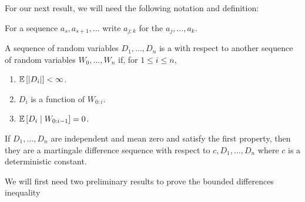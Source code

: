 \documentclass[11pt]{scrartcl}
\begin{document}
For our next result, we will need the following notation and definition:

For a sequence $a_s, a_{s+1}, ... $ write $a_{j:k}$ for the  $a_j, ... , a_k$.

\begin{definition}
A sequence of random variables $D_1, ... , D_n$ is a  with respect to another sequence of random variables $W_0, ... , W_n$ if, for $1 \le i \le n$,
\begin{enumerate}
    \item $\mathbb{E} \left[ |D_i| \right] < \infty$.
    \item $D_i$ is a function of $W_{0:i}$.
    \item $\mathbb{E} \left[ D_i \mid W_{0:i-1} \right] = 0$.
\end{enumerate}
\end{definition}

\begin{example}
If $D_1, ... , D_n$ are independent and mean zero and satisfy the first property, then they are a martingale difference sequence with respect to $c, D_1, ... , D_n$ where $c$ is a deterministic constant.
\end{example}

We will first need two preliminary results to prove the bounded differences inequality

\end{document}

